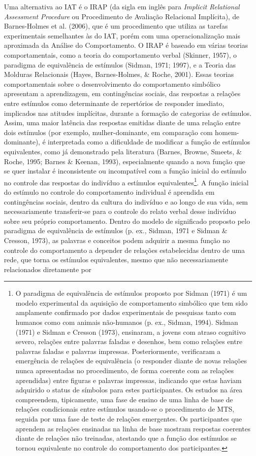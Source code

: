 Uma alternativa ao IAT é o IRAP (da sigla em inglês para \textit{Implicit Relational Assessment Procedure} ou Procedimento de Avaliação Relacional Implícita), de Barnes-Holmes et al. (2006), que é um procedimento que utiliza as tarefas experimentais semelhantes às do IAT, porém com uma operacionalização mais aproximada da Análise do Comportamento. O IRAP é baseado em várias teorias comportamentais, como a teoria do comportamento verbal (Skinner, 1957), o paradigma de equivalência de estímulos (Sidman, 1971; 1997), e a Teoria das Molduras Relacionais (Hayes, Barnes-Holmes, \& Roche, 2001). Essas teorias comportamentais sobre o desenvolvimento do comportamento simbólico apresentam a aprendizagem, em contingências sociais, das respostas a relações entre estímulos como determinante de repertórios de responder imediato, implicados nas atitudes implícitas, durante a formação de categorias de estímulos. Assim, uma maior latência das respostas emitidas diante de uma relação entre dois estímulos (por exemplo, mulher-dominante, em comparação com homem-dominante), é interpretada como a dificuldade de modificar a função de estímulos equivalentes, como já demonstrado pela literatura (Barnes, Browne, Smeets, \& Roche, 1995; Barnes \& Keenan, 1993), especialmente quando a nova função que se quer instalar é inconsistente ou incompatível com a função inicial do estímulo no controle das respostas do indivíduo a estímulos equivalentes\footnote{O paradigma de equivalência de estímulos proposto por Sidman (1971) é um modelo experimental da aquisição de comportamento simbólico que tem sido amplamente confirmado por dados experimentais de pesquisas tanto com humanos como com animais não-humanos (p. ex., Sidman, 1994). Sidman (1971) e Sidman e Cresson (1973), ensinaram, a jovens com atraso cognitivo severo, relações entre palavras faladas e desenhos, bem como relações entre palavras faladas e palavras impressas. Posteriormente, verificaram a emergência de relações de equivalência (o responder diante de novas relações nunca apresentadas no procedimento, de forma coerente com as relações aprendidas) entre figuras e palavras impressas, indicando que estas haviam adquirido o status de símbolos para estes participantes. Os estudos na área compreendem, tipicamente, uma fase de ensino de uma linha de base de relações condicionais entre estímulos usando-se o procedimento de MTS, seguida por uma fase de teste de relações emergentes. Os participantes que aprendem as relações ensinadas na linha de base mostram respostas coerentes diante de relações não treinadas, atestando que a função dos estímulos se tornou equivalente no controle do comportamento dos participantes.}. A função inicial do estímulo no controle do comportamento individual é aprendida em contingências sociais, dentro da cultura do indivíduo e ao longo de sua vida, sem necessariamente transferir-se para o controle do relato verbal desse indivíduo sobre seu próprio comportamento. Dentro do modelo de significado proposto pelo paradigma de equivalência de estímulos (p. ex., Sidman, 1971 e Sidman \& Cresson, 1973), as palavras e conceitos podem adquirir a mesma função no controle do comportamento a depender de relações estabelecidas dentro de uma rede, que torna os estímulos equivalentes, mesmo que não necessariamente relacionados diretamente por 